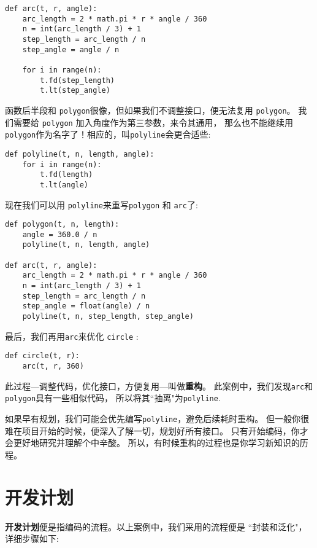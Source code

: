 \documentclass[10pt]{book}
\begin{document}
\begin{verbatim}
def arc(t, r, angle):
    arc_length = 2 * math.pi * r * angle / 360
    n = int(arc_length / 3) + 1
    step_length = arc_length / n
    step_angle = angle / n
    
    for i in range(n):
        t.fd(step_length)
        t.lt(step_angle)
\end{verbatim}
%
函数后半段和 {\tt polygon}很像，但如果我们不调整接口，便无法复用 {\tt polygon}。
我们需要给 {\tt polygon} 加入角度作为第三参数，来令其通用，
那么也不能继续用 {\tt polygon}作为名字了！相应的，叫{\tt polyline}会更合适些:

\begin{verbatim}
def polyline(t, n, length, angle):
    for i in range(n):
        t.fd(length)
        t.lt(angle)
\end{verbatim}
%
现在我们可以用 {\tt polyline}来重写{\tt polygon} 和 {\tt arc}了:

\begin{verbatim}
def polygon(t, n, length):
    angle = 360.0 / n
    polyline(t, n, length, angle)

def arc(t, r, angle):
    arc_length = 2 * math.pi * r * angle / 360
    n = int(arc_length / 3) + 1
    step_length = arc_length / n
    step_angle = float(angle) / n
    polyline(t, n, step_length, step_angle)
\end{verbatim}
%
最后，我们再用{\tt arc}来优化 {\tt circle} :

\begin{verbatim}
def circle(t, r):
    arc(t, r, 360)
\end{verbatim}
%
此过程---调整代码，优化接口，方便复用---叫做{\bf 重构}。
此案例中，我们发现{\tt arc}和{\tt polygon}具有一些相似代码，
所以将其``抽离"为{\tt polyline}.\

如果早有规划，我们可能会优先编写{\tt polyline}，避免后续耗时重构。
但一般你很难在项目开始的时候，便深入了解一切，规划好所有接口。
只有开始编码，你才会更好地研究并理解个中辛酸。
所以，有时候重构的过程也是你学习新知识的历程。


\section{开发计划}

{\bf 开发计划}便是指编码的流程。以上案例中，我们采用的流程便是
``封装和泛化"，详细步骤如下:
\end{document}

